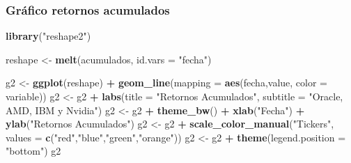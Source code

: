 \documentclass[12pt,]{book}
\newenvironment{Shaded}{\begin{snugshade}}{\end{snugshade}}
\newcommand{\KeywordTok}[1]{\textcolor[rgb]{0.13,0.29,0.53}{\textbf{#1}}}
\newcommand{\DataTypeTok}[1]{\textcolor[rgb]{0.13,0.29,0.53}{#1}}
\newcommand{\StringTok}[1]{\textcolor[rgb]{0.31,0.60,0.02}{#1}}
\newcommand{\OperatorTok}[1]{\textcolor[rgb]{0.81,0.36,0.00}{\textbf{#1}}}
\newcommand{\NormalTok}[1]{#1}
\begin{document}
\subsubsection{Gráfico retornos
acumulados}\label{grafico-retornos-acumulados}

\begin{Shaded}
\begin{Highlighting}[]
\KeywordTok{library}\NormalTok{(}\StringTok{"reshape2"}\NormalTok{)}
\end{Highlighting}
\end{Shaded}

\begin{Shaded}
\begin{Highlighting}[]
\NormalTok{reshape <-}\StringTok{ }\KeywordTok{melt}\NormalTok{(acumulados, }\DataTypeTok{id.vars =} \StringTok{"fecha"}\NormalTok{)}
\end{Highlighting}
\end{Shaded}

\begin{Shaded}
\begin{Highlighting}[]
\NormalTok{g2 <-}\StringTok{ }\KeywordTok{ggplot}\NormalTok{(reshape) }\OperatorTok{+}\StringTok{ }\KeywordTok{geom_line}\NormalTok{(}\DataTypeTok{mapping =} \KeywordTok{aes}\NormalTok{(fecha,value, }\DataTypeTok{color =}\NormalTok{ variable))}
\NormalTok{g2 <-}\StringTok{ }\NormalTok{g2 }\OperatorTok{+}\StringTok{ }\KeywordTok{labs}\NormalTok{(}\DataTypeTok{title =} \StringTok{"Retornos Acumulados"}\NormalTok{, }\DataTypeTok{subtitle =} \StringTok{"Oracle, AMD, IBM y Nvidia"}\NormalTok{)}
\NormalTok{g2 <-}\StringTok{ }\NormalTok{g2 }\OperatorTok{+}\StringTok{ }\KeywordTok{theme_bw}\NormalTok{() }\OperatorTok{+}\StringTok{ }\KeywordTok{xlab}\NormalTok{(}\StringTok{"Fecha"}\NormalTok{) }\OperatorTok{+}\StringTok{ }\KeywordTok{ylab}\NormalTok{(}\StringTok{"Retornos Acumulados"}\NormalTok{)}
\NormalTok{g2 <-}\StringTok{ }\NormalTok{g2 }\OperatorTok{+}\StringTok{ }\KeywordTok{scale_color_manual}\NormalTok{(}\StringTok{"Tickers"}\NormalTok{, }\DataTypeTok{values =} \KeywordTok{c}\NormalTok{(}\StringTok{"red"}\NormalTok{,}\StringTok{"blue"}\NormalTok{,}\StringTok{"green"}\NormalTok{,}\StringTok{"orange"}\NormalTok{))}
\NormalTok{g2 <-}\StringTok{ }\NormalTok{g2 }\OperatorTok{+}\StringTok{ }\KeywordTok{theme}\NormalTok{(}\DataTypeTok{legend.position =} \StringTok{"bottom"}\NormalTok{)}
\NormalTok{g2}
\end{Highlighting}
\end{Shaded}
\end{document}
